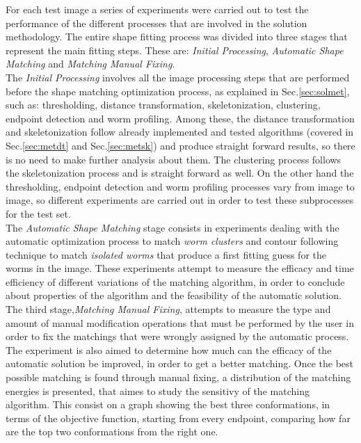 For each test image a series of experiments were carried out to test the performance of
the different processes that are involved in the solution methodology. The entire 
shape fitting process was divided into three stages that represent the 
main fitting steps. These are: \emph{Initial Processing}, \emph{Automatic Shape Matching} and
\emph{Matching Manual Fixing}.\\

The \emph{Initial Processing} involves all the image processing steps that are performed 
before the shape matching optimization process, as explained in Sec.\ref{sec:solmet},
such as: thresholding, distance transformation, skeletonization, 
clustering, endpoint detection and worm profiling. Among these, the distance transformation
and skeletonization follow already implemented and tested algorithms (covered in Sec.\ref{sec:metdt}
and Sec.\ref{sec:metsk}) and produce straight forward results, so there is no need to make further analysis
about them.
The clustering process follows the skeletonization process and is straight forward as well.
On the other hand the thresholding, endpoint detection and worm profiling processes vary 
from image to image, so different experiments are carried out in order to test these subprocesses
for the test set.\\

The \emph{Automatic Shape Matching} stage consists in experiments dealing with the automatic
optimization process to match \emph{worm clusters} and contour following technique to match 
\emph{isolated worms} that produce a first fitting guess for the worms in the image. These 
experiments attempt to measure the efficacy and time efficiency of different variations of the
matching algorithm, in order to conclude about properties of the algorithm and the feasibility 
of the automatic solution.\\
The third stage,\emph{Matching Manual Fixing}, attempts to measure the type and amount of 
manual modification operations that must be performed by the user in order to fix the 
matchings that were wrongly assigned by the automatic process. The experiment is also 
aimed to determine how much can the efficacy of the automatic solution be improved, in
order to get a better matching. Once the best possible matching is found through manual fixing,
a distribution of the matching energies is presented, that aimes to study the sensitivy of the
matching algorithm. This consist on a graph showing the best three conformations, in terms of the objective
function, starting from every endpoint, comparing how far are the top two conformations from
the right one.\\

